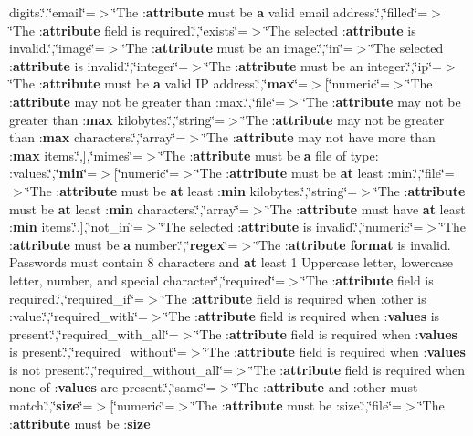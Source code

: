 digits.\char`\"{},\char`\"{}email\char`\"{}=$>$\char`\"{}The \+:{\bf attribute} must be {\bf a} valid email address.\char`\"{},\char`\"{}filled\char`\"{}=$>$\char`\"{}The \+:{\bf attribute} field is required.\char`\"{},\char`\"{}exists\char`\"{}=$>$\char`\"{}The selected \+:{\bf attribute} is invalid.\char`\"{},\char`\"{}image\char`\"{}=$>$\char`\"{}The \+:{\bf attribute} must be an image.\char`\"{},\char`\"{}in\char`\"{}=$>$\char`\"{}The selected \+:{\bf attribute} is invalid.\char`\"{},\char`\"{}integer\char`\"{}=$>$\char`\"{}The \+:{\bf attribute} must be an integer.\char`\"{},\char`\"{}ip\char`\"{}=$>$\char`\"{}The \+:{\bf attribute} must be {\bf a} valid I\+P address.\char`\"{},\char`\"{}{\bf max}\char`\"{}=$>$[\char`\"{}numeric\char`\"{}=$>$\char`\"{}The \+:{\bf attribute} may not be greater than \+:max.\char`\"{},\char`\"{}file\char`\"{}=$>$\char`\"{}The \+:{\bf attribute} may not be greater than \+:{\bf max} kilobytes.\char`\"{},\char`\"{}string\char`\"{}=$>$\char`\"{}The \+:{\bf attribute} may not be greater than \+:{\bf max} characters.\char`\"{},\char`\"{}array\char`\"{}=$>$\char`\"{}The \+:{\bf attribute} may not have more than \+:{\bf max} items.\char`\"{},],\char`\"{}mimes\char`\"{}=$>$\char`\"{}The \+:{\bf attribute} must be {\bf a} file of type\+: \+:values.\char`\"{},\char`\"{}{\bf min}\char`\"{}=$>$[\char`\"{}numeric\char`\"{}=$>$\char`\"{}The \+:{\bf attribute} must be {\bf at} least \+:min.\char`\"{},\char`\"{}file\char`\"{}=$>$\char`\"{}The \+:{\bf attribute} must be {\bf at} least \+:{\bf min} kilobytes.\char`\"{},\char`\"{}string\char`\"{}=$>$\char`\"{}The \+:{\bf attribute} must be {\bf at} least \+:{\bf min} characters.\char`\"{},\char`\"{}array\char`\"{}=$>$\char`\"{}The \+:{\bf attribute} must have {\bf at} least \+:{\bf min} items.\char`\"{},],\char`\"{}not\+\_\+in\char`\"{}=$>$\char`\"{}The selected \+:{\bf attribute} is invalid.\char`\"{},\char`\"{}numeric\char`\"{}=$>$\char`\"{}The \+:{\bf attribute} must be {\bf a} number.\char`\"{},\char`\"{}{\bf regex}\char`\"{}=$>$\char`\"{}The \+:{\bf attribute} {\bf format} is invalid. Passwords must contain 8 characters and {\bf at} least 1 Uppercase letter, lowercase letter, number, and special character\char`\"{},\char`\"{}required\char`\"{}=$>$\char`\"{}The \+:{\bf attribute} field is required.\char`\"{},\char`\"{}required\+\_\+if\char`\"{}=$>$\char`\"{}The \+:{\bf attribute} field is required when \+:other is \+:value.\char`\"{},\char`\"{}required\+\_\+with\char`\"{}=$>$\char`\"{}The \+:{\bf attribute} field is required when \+:{\bf values} is present.\char`\"{},\char`\"{}required\+\_\+with\+\_\+all\char`\"{}=$>$\char`\"{}The \+:{\bf attribute} field is required when \+:{\bf values} is present.\char`\"{},\char`\"{}required\+\_\+without\char`\"{}=$>$\char`\"{}The \+:{\bf attribute} field is required when \+:{\bf values} is not present.\char`\"{},\char`\"{}required\+\_\+without\+\_\+all\char`\"{}=$>$\char`\"{}The \+:{\bf attribute} field is required when none of \+:{\bf values} are present.\char`\"{},\char`\"{}same\char`\"{}=$>$\char`\"{}The \+:{\bf attribute} and \+:other must match.\char`\"{},\char`\"{}{\bf size}\char`\"{}=$>$[\char`\"{}numeric\char`\"{}=$>$\char`\"{}The \+:{\bf attribute} must be \+:size.\char`\"{},\char`\"{}file\char`\"{}=$>$\char`\"{}The \+:{\bf attribute} must be \+:{\bf size} 